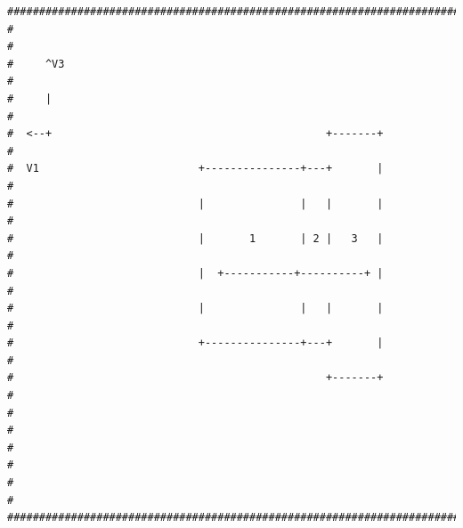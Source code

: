 \documentclass[onecolumn,10pt]{jhwhw}
\begin{document}
\begin{lstlisting}[caption={Hubble ASCII Diagram. Solar panel distance from HST is exaggerated. One character is $\approx$ 20 inches.}]
#########################################################################################
#                                                                                       #
#     ^V3                                                                               #
#     |                                                                                 #
#  <--+                                           +-------+                             #
#  V1                         +---------------+---+       |                             #
#                             |               |   |       |                             #
#                             |       1       | 2 |   3   |                             #
#                             |  +-----------+----------+ |                             #
#                             |               |   |       |                             #
#                             +---------------+---+       |                             #
#                                                 +-------+                             #
#                                                                                       #
#                                                                                       #
#                                                                                       #
#########################################################################################
\end{lstlisting}
\end{document}
